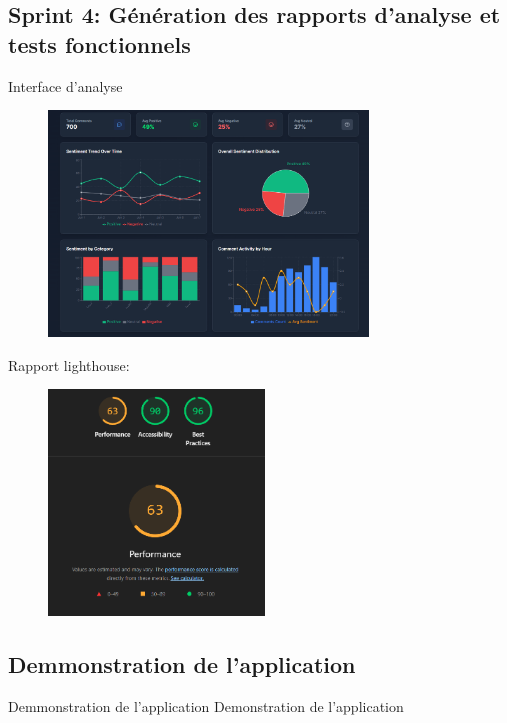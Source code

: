 \subsection{Sprint 4: Génération des rapports d'analyse et tests fonctionnels}

\begin{frame}{Interface d'analyse }
    \begin{figure}[H]
        \centering
        \includegraphics[height=6cm]{assets/images/admin-ui.png}
    \end{figure}
\end{frame}

\begin{frame}{Rapport lighthouse:}
    \begin{figure}[H]
        \centering
        \includegraphics[height=6cm]{assets/images/lighthouse.png}
    \end{figure}
\end{frame}

\subsection{Demmonstration de l'application}
\begin{frame}{Demmonstration de l'application}
    Demonstration de l'application
\end{frame}
